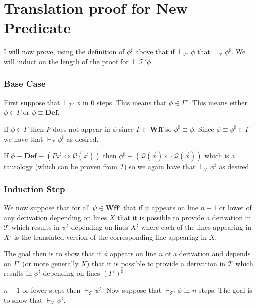 \documentclass[12pt]{article}
\newcommand{\bv}[1]{\boldsymbol{#1}}
\newcommand{\mc}[1]{\mathcal{#1}}
\newcommand{\bc}[1]{\bv{\mc{#1}}}
\begin{document}
\hrulefill

\section*{Translation proof for New Predicate}

I will now prove, using the definition of $\phi^{\sharp}$ above that if $\vdash_{\bc{T}'}\phi$ that $\vdash_{\bc{T}}\phi^{\sharp}$. We will induct on the length of the proof for $\vdash{\bc{T}'}\phi$.

\subsubsection*{Base Case}
First suppose that $\vdash_{\bc{T}'}\phi$ in 0 steps. This means that $\phi \in \Gamma'$. This means either $\phi \in \Gamma$ or $\phi \equiv \textbf{Def}$. 

If $\phi \in \Gamma$ then $P$ does not appear in $\phi$ since $\Gamma \subset \textbf{Wff}$ so $\phi^{\sharp} \equiv \phi$. Since $\phi \equiv \phi^{\sharp} \in \Gamma$ we have that $\vdash_{\bc{T}}\phi^{\sharp}$ as desired.

If $\phi \equiv \textbf{Def} \equiv (P\vec{x} \iff \mc{Q}(\vec{x}))$ then $\phi^{\sharp} \equiv (\mc{Q}(\vec{x}) \iff \mc{Q}(\vec{x}))$ which is a tautology (which can be proven from $\bc{I}$) so we again have that $\vdash_{\bc{T}}\phi^{\sharp}$ as desired.

\subsubsection*{Induction Step}
We now suppose that for all $\psi\in \textbf{Wff}'$ that if $\psi$ appears on line $n-1$ or lower of any derivation depending on lines $X$ that it is possible to provide a derivation in $\bc{T}$ which results in $\psi^{\sharp}$ depending on lines $X^{\sharp}$ where each of the lines appearing in $X^{\sharp}$ is the translated version of the corresponding line appearing in $X$.

The goal then is to show that if $\phi$ appears on line $n$ of a derivation and depends on $\Gamma'$ (or more generally $X$) that it is possible to provide a derivation in $\bc{T}$ which results in $\phi^{\sharp}$  depending on lines $(\Gamma')^{\sharp}$

$n-1$ or fewer steps then $\vdash_{\bc{T}}\psi^{\sharp}$. Now suppose that $\vdash_{\bc{T}'}\phi$ in $n$ steps. The goal is to show that $\vdash_{\bc{T}}\phi^{\sharp}$.
\end{document}

